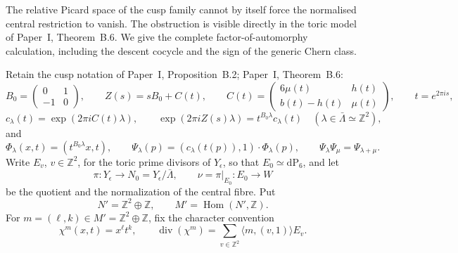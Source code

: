 The relative Picard space of the cusp family cannot by itself force the
normalised central restriction to vanish.  The obstruction is visible
directly in the toric model of Paper~I, Theorem~B.6.  We give
the complete factor-of-automorphy calculation, including the descent
cocycle and the sign of the generic Chern class.

Retain the cusp notation of
Paper~I, Proposition~B.2; Paper~I, Theorem~B.6:
\[
 B_0=\begin{pmatrix}0&1\\-1&0\end{pmatrix},
 \qquad
 Z(s)=sB_0+C(t),
 \qquad
 C(t)=\begin{pmatrix}6\mu(t)&h(t)\\ b(t)-h(t)&\mu(t)\end{pmatrix},
 \qquad t=e^{2\pi i s},
\tag{W.61}\label{wbII:eq:W:5.17t}
\]
\[
 c_{\lambda}(t)=\exp(2\pi iC(t)\lambda),
 \qquad
 \exp(2\pi iZ(s)\lambda)=t^{B_0\lambda}c_\lambda(t)
 \quad(\lambda\in\bar\Lambda\simeq\mathbb Z^2),
\tag{W.62}\label{wbII:eq:W:5.17u}
\]
and
\[
 \Phi_\lambda(x,t)=(t^{B_0\lambda}x,t),
 \qquad
 \Psi_\lambda(p)=(c_\lambda(t(p)),1)\cdot\Phi_\lambda(p),
 \qquad
 \Psi_\lambda\Psi_\mu=\Psi_{\lambda+\mu}.
\tag{W.63}\label{wbII:eq:W:5.17v}
\]
Write \(E_v\), \(v\in\mathbb Z^2\), for the toric prime divisors of
\(Y_\epsilon\), so that \(E_0\simeq\mathrm{dP}_6\), and let
\[
 \pi:Y_\epsilon\longrightarrow N_0=Y_\epsilon/\bar\Lambda,
 \qquad
 \nu=\pi|_{E_0}:E_0\longrightarrow W
\]
be the quotient and the normalization of the central fibre.
Put
\[
 N'=\mathbb Z^2\oplus\mathbb Z,
 \qquad
 M'=\operatorname{Hom}(N',\mathbb Z).
\]
For \(m=(\ell,k)\in M'=\mathbb Z^2\oplus\mathbb Z\), fix the character
convention
\[
 \chi^m(x,t)=x^\ell t^k,
 \qquad
 \operatorname{div}(\chi^m)=
 \sum_{v\in\mathbb Z^2}\langle m,(v,1)\rangle E_v.
\tag{W.64}\label{wbII:eq:W:5.17w}
\]

